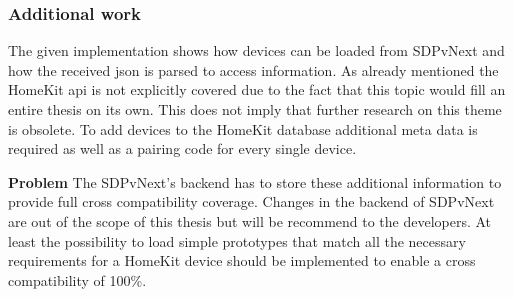 
		\subsubsection{Additional work}
			The given implementation shows how devices can be loaded from SDPvNext and how the received json is parsed to access information. As already mentioned the HomeKit api is not explicitly covered due to the fact that this topic would fill an entire thesis on its own. This does not imply that further research on this theme is obsolete. To add devices to the HomeKit database additional meta data is required as well as a pairing code for every single device.


			\textbf{Problem}
				The SDPvNext's backend has to store these additional information to provide full cross compatibility coverage. Changes in the backend of SDPvNext are out of the scope of this thesis but will be recommend to the developers. At least the possibility to load simple prototypes that match all the necessary requirements for a HomeKit device should be implemented to enable a cross compatibility of 100\%.

\pagebreak